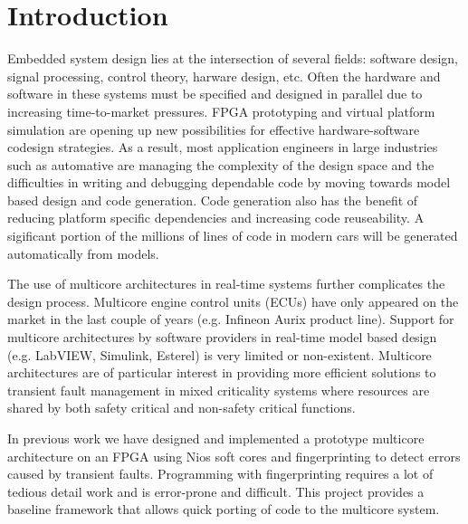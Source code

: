 
\chapter{Introduction} %

\label{c:intro} %



	Embedded system design lies at the intersection of several fields: software design, signal processing, control theory, harware design, etc. 
	Often the hardware and software in these systems must be specified and designed in parallel due to increasing time-to-market pressures. 
	FPGA prototyping and virtual platform simulation are opening up new possibilities for effective hardware-software codesign strategies. 
	As a result, most application engineers in large industries such as automative are managing the complexity of the design space and the difficulties in writing and debugging dependable code by moving towards model based design and code generation. 
	Code generation also has the benefit of reducing platform specific dependencies and increasing code reuseability. 
	A sigificant portion of the millions of lines of code in modern cars will be generated automatically from models.

	The use of multicore architectures in real-time systems further complicates the design process. 
	Multicore engine control units (ECUs) have only appeared on the market in the last couple of years (e.g. Infineon Aurix product line). 
	Support for multicore architectures by software providers in real-time model based design (e.g. LabVIEW, Simulink, Esterel) is very limited or non-existent.
	Multicore architectures are of particular interest in providing more efficient solutions to transient fault management in mixed criticality systems where resources are shared by both safety critical and non-safety critical functions. 

	In previous work we have designed and implemented a prototype multicore architecture on an FPGA using Nios soft cores and fingerprinting to detect errors caused by transient faults. 
	Programming with fingerprinting requires a lot of tedious detail work and is error-prone and difficult.
	This project provides a baseline framework that allows quick porting of code to the multicore system. 
	

